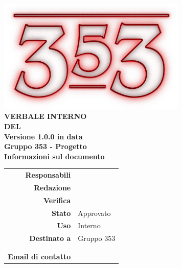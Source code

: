 \documentclass[openany, a4paper, 12pt]{report}
\begin{document}
\begin{titlepage}
	\centering
	\vfill
	{
		\bfseries
		\vskip2cm
		\includegraphics[width=9cm]{../../common/images/logo.png} \\
		\vfill
		\Huge{VERBALE INTERNO\\DEL {}}\\
		\vfill
		\Large Versione 1.0.0 in data \\
		\large Gruppo 353 - Progetto \progetto \\
		\vfill
		\normalsize Informazioni sul documento\\
		\begin{table}[htbp]
			\centering
			\renewcommand\arraystretch{1.2}
			\begin{tabular}{r|l}
				\hline
				\textbf{Responsabili}	& \Riccardo\\
				\textbf{Redazione} 		& \Davide \\
				\textbf{Verifica} 		& \Parwinder\\
				
				\textbf{Stato} 			& Approvato\\
				\textbf{Uso}			& Interno\\
				\textbf{Destinato a}   	& Gruppo 353\\
										& \Vardanega\\
										& \Cardin\\
				
				\textbf{Email di contatto}	& \mailgroup
			\end{tabular}
		\end{table}
		\vfill 
	}    
\end{titlepage}
\newpage
{}

 
\end{document}
